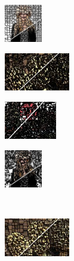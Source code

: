 \begin{figure}
\begin{subfigure}[b]{0.129\textwidth}
	\end{subfigure}
	\begin{subfigure}[b]{0.10\textwidth}
		\includegraphics[height=1.65cm]{pictures/fash/pb/cropped/pb_132_contours}
	\end{subfigure}
	\begin{subfigure}[b]{0.02\textwidth}
	\end{subfigure}
	\begin{subfigure}[b]{0.16\textwidth}
		\includegraphics[height=1.65cm]{pictures/bsds500/seeds/cropped/seeds_208078_contours}
	\end{subfigure}
	\begin{subfigure}[b]{0.129\textwidth}
		\includegraphics[height=1.65cm]{pictures/sbd/seeds/cropped/seeds_6000067_contours}
	\end{subfigure}
	\begin{subfigure}[b]{0.10\textwidth}
		\includegraphics[height=1.65cm]{pictures/fash/seeds/cropped/seeds_132_contours}
	\end{subfigure}\\
	\begin{subfigure}[b]{0.02\textwidth}
	\end{subfigure}
	\begin{subfigure}[b]{0.16\textwidth}
		\includegraphics[height=1.65cm]{pictures/bsds500/tps/cropped/tps_208078_contours}

\end{subfigure}
\end{figure}
